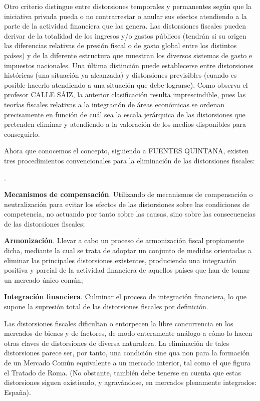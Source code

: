 \documentclass[10pt,a4paper]{article}
\newcounter{numitem}
\newenvironment{lnum}
      {\begin{list}{\arabic{numitem}.}{%
          \usecounter{numitem}%
          \setlength{\leftmargin}{1cm}%
          \setlength{\parskip}{3pt}%
          \setlength{\itemsep}{0pt}%
          \setlength{\parsep}{0pt}%
      }}
      {\end{list}}
\begin{document}
{    Otro criterio distingue entre distorsiones temporales y permanentes según que la iniciativa privada pueda o no contrarrestar o anular sus efectos atendiendo a la parte de la actividad financiera que las genera. Las distorsiones fiscales pueden derivar de la totalidad de los ingresos y/o gastos públicos (tendrán si su origen las diferencias relativas de presión fiscal o de gasto global entre los distintos países) y de la diferente estructura que muestran los diversos sistemas de gasto e impuestos nacionales. Una última distinción puede establecerse entre distorsiones históricas (una situación ya alcanzada) y distorsiones previsibles (cuando es posible hacerlo atendiendo a una situación que debe lograrse). Como observa el profesor CALLE SÁIZ, la anterior clasificación resulta imprescindible, pues las teorías fiscales relativas a la integración de áreas económicas se ordenan precisamente en función de cuál sea la escala jerárquica de las distorsiones que pretenden eliminar y atendiendo a la valoración de los medios disponibles para conseguirlo.
} 

Ahora que conocemos el concepto, siguiendo a FUENTES QUINTANA, existen tres procedimientos convencionales para la eliminación de las distorsiones fiscales:
\begin{lnum}
    \item \textbf{Mecanismos de compensación}. Utilizando de mecanismos de compensación o neutralización para evitar los efectos de las distorsiones sobre las condiciones de competencia, no actuando por tanto sobre las causas, sino sobre las consecuencias de las distorsiones fiscales;
    \item \textbf{Armonización}. Llevar a cabo un proceso de armonización fiscal propiamente dicha, mediante la cual se trata de adoptar un conjunto de medidas orientadas a eliminar las principales distorsiones existentes, produciendo una integración positiva y parcial de la actividad financiera de aquellos países que han de tomar un mercado único común;
    \item \textbf{Integración financiera}. Culminar el proceso de integración financiera, lo que supone la supresión total de las distorsiones fiscales por definición.
\end{lnum}

Las distorsiones fiscales dificultan o entorpecen la libre concurrencia en los mercados de bienes y de factores, de modo enteramente análogo a cómo lo hacen otras claves de distorsiones de diversa naturaleza. La eliminación de tales distorsiones parece ser, por tanto, una condición sine qua non para la formación de un Mercado Común equivalente a un mercado interior, tal como el que figura el Tratado de Roma. (No obstante, también debe tenerse en cuenta que estas distorsiones siguen existiendo, y agravándose, en mercados plenamente integrados: España). 
\end{document}
